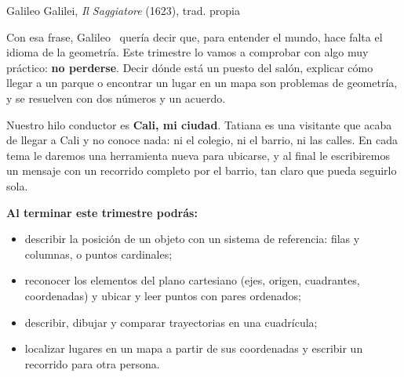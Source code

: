 \documentclass[11pt]{article}
\begin{document}
\encabezado

{Galileo Galilei, \emph{Il Saggiatore} (1623), trad. propia}


Con esa frase, Galileo~\cite{galileo1623} quería decir que, para entender el mundo, hace falta
el idioma de la geometría. Este trimestre lo vamos a comprobar con algo muy práctico:
\textbf{no perderse}. Decir dónde está un puesto del salón, explicar cómo llegar a un parque o
encontrar un lugar en un mapa son problemas de geometría, y se resuelven con dos números y un
acuerdo.

Nuestro hilo conductor es \textbf{Cali, mi ciudad}. Tatiana es una visitante que acaba de
llegar a Cali y no conoce nada: ni el colegio, ni el barrio, ni las calles. En cada tema le
daremos una herramienta nueva para ubicarse, y al final le escribiremos un mensaje con un
recorrido completo por el barrio, tan claro que pueda seguirlo sola.

\textbf{Al terminar este trimestre podrás:}
\begin{itemize}
  \item describir la posición de un objeto con un sistema de referencia: filas y columnas, o
        puntos cardinales;
  \item reconocer los elementos del plano cartesiano (ejes, origen, cuadrantes, coordenadas) y
        ubicar y leer puntos con pares ordenados;
  \item describir, dibujar y comparar trayectorias en una cuadrícula;
  \item localizar lugares en un mapa a partir de sus coordenadas y escribir un recorrido para
        otra persona.
\end{itemize}
\end{document}
